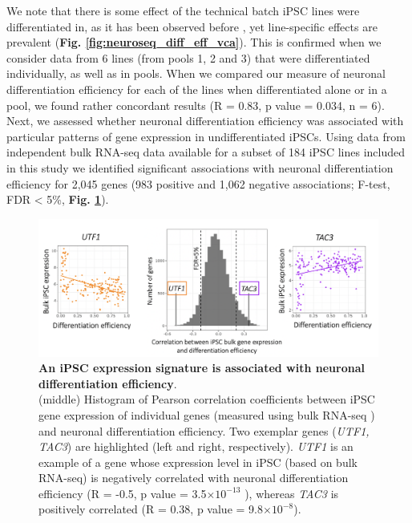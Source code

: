 \newpage

We note that there is some effect of the technical batch iPSC lines were differentiated in, as it has been observed before \cite{kilpinen2017common, schwartzentruber2018molecular}, yet line-specific effects are prevalent (\textbf{Fig. \ref{fig:neuroseq_diff_eff_vca}}).
This is confirmed when we consider data from 6 lines (from pools 1, 2 and 3) that were differentiated individually, as well as in pools.
When we compared our measure of neuronal differentiation efficiency for each of the lines when differentiated alone or in a pool, we found rather concordant results (R = 0.83, p value = 0.034, n = 6).\\ 

Next, we assessed whether neuronal differentiation efficiency was associated with particular patterns of gene expression in undifferentiated iPSCs. 
Using data from independent bulk RNA-seq data available for a subset of 184 iPSC lines included in this study \cite{kilpinen2017common, bonder2019systematic} we identified significant associations with neuronal differentiation efficiency for 2,045 genes (983 positive and 1,062 negative associations; F-test, FDR < 5\%, \textbf{Fig. \ref{fig:neuroseq_ips_expression_signature}}). 

\begin{figure}[h]
\centering
\includegraphics[width=16cm]{Chapter5/Fig/neuroseq_ips_bulk_expr_correlations.png}
\caption[iPS expression signature of neuronal differentiation efficiency]{\textbf{An iPSC expression signature is associated with neuronal differentiation efficiency}.\\
(middle) Histogram of Pearson correlation coefficients between iPSC gene expression of individual genes (measured using bulk RNA-seq \cite{bonder2019systematic}) and neuronal differentiation efficiency. 
Two exemplar genes (\textit{UTF1, TAC3}) are highlighted (left and right, respectively). 
\textit{UTF1} is an example of a gene whose expression level in iPSC (based on bulk RNA-seq) is negatively correlated with neuronal differentiation efficiency (R = -0.5, p value = 3.5$ \times 10^{-13}$ ), whereas \textit{TAC3} is positively correlated (R = 0.38, p value = 9.8$ \times 10^{-8}$).}
\label{fig:neuroseq_ips_expression_signature}
\end{figure}

